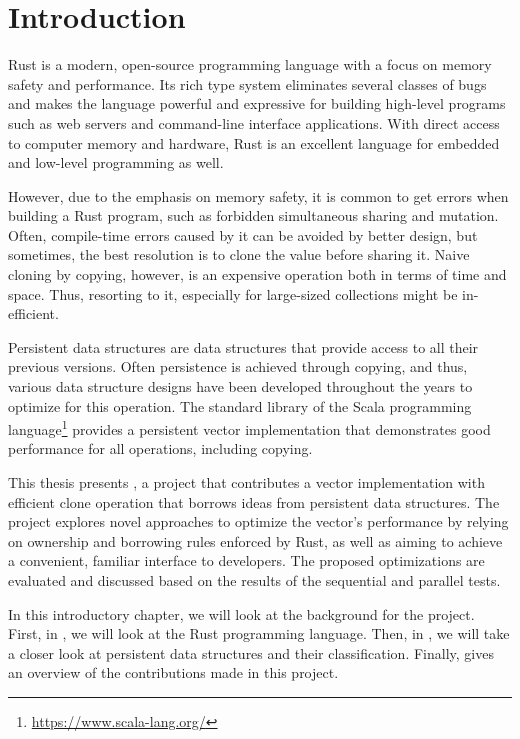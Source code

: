 \chapter{Introduction}

Rust is a modern, open-source programming language with a focus on memory safety and performance. Its rich type system eliminates several classes of bugs and makes the language powerful and expressive for building high-level programs such as web servers and command-line interface applications. With direct access to computer memory and hardware, Rust is an excellent language for embedded and low-level programming as well.

However, due to the emphasis on memory safety, it is common to get errors when building a Rust program, such as forbidden simultaneous sharing and mutation. Often, compile-time errors caused by it can be avoided by better design, but sometimes, the best resolution is to clone the value before sharing it. Naive cloning by copying, however, is an expensive operation both in terms of time and space. Thus, resorting to it, especially for large-sized collections might be in-efficient.

Persistent data structures are data structures that provide access to all their previous versions. Often persistence is achieved through copying, and thus, various data structure designs have been developed throughout the years to optimize for this operation. The standard library of the Scala programming language\footnote{\url{https://www.scala-lang.org/}} provides a persistent vector implementation that demonstrates good performance for all operations, including copying.

This thesis presents \pvecrs{}, a project that contributes a vector implementation with efficient clone operation that borrows ideas from persistent data structures. The project explores novel approaches to optimize the vector's performance by relying on ownership and borrowing rules enforced by Rust, as well as aiming to achieve a convenient, familiar interface to developers. The proposed optimizations are evaluated and discussed based on the results of the sequential and parallel tests.

In this introductory chapter, we will look at the background for the \pvecrs{} project. First, in , we will look at the Rust programming language. Then, in , we will take a closer look at persistent data structures and their classification. Finally,  gives an overview of the contributions made in this project.

